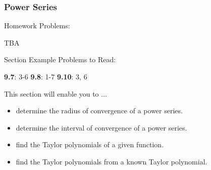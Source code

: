 %
%

\begin{frame}
\frametitle{\Large {\color[rgb]{0.02,0.20,1.0} Power Series}}
\vspace{0.6cm}
\begin{block}{Homework Problems:}

\vspace{0.2cm}

TBA
	
\end{block}
\vspace{0.2cm}

\begin{block}{Section Example Problems to Read:}

\vspace{0.2cm}

\hspace{2.0cm} {\bf 9.7}: 3-6 \hspace{1.0cm} {\bf 9.8}: 1-7 \hspace{1.0cm} {\bf 9.10}: 3, 6
	
\end{block}
\vspace{0.1cm}

\begin{block}{This section will enable you to ...}
\begin{itemize}
	\item[...] determine the radius of convergence of a power series.
	\item[...] determine the interval of convergence of a power series.
	\item[...] find the Taylor polynomials of a given function.
	\item[...] find the Taylor polynomials from a known Taylor polynomial.
\end{itemize}
\end{block}
\vspace{3.0cm}
\end{frame}

